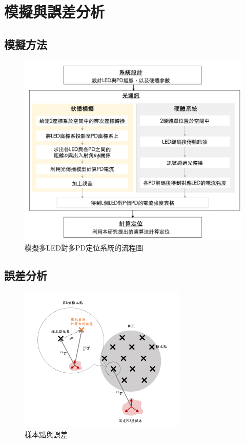 \chapter{模擬與誤差分析}
\label{chp:4}




\section{模擬方法}

\begin{figure}[ht]
    \centering
    \includegraphics[width=14cm]{ch4pic/simulation_flow.png}
    \caption{模擬多LED對多PD定位系統的流程圖}
    \label{pic:simulation_flow}
\end{figure}


\section{誤差分析}
\begin{figure}[ht]
    \centering
    \includegraphics[width=8cm]{ch4pic/error.png}
    \caption{樣本點與誤差}
    \label{pic:error}
\end{figure}

